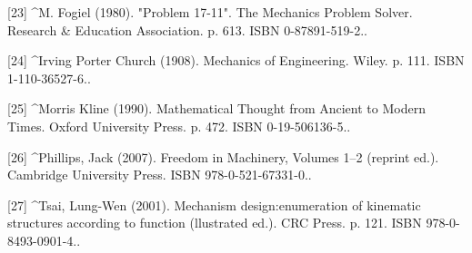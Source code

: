 [23]
^M. Fogiel (1980). "Problem 17-11". The Mechanics Problem Solver. Research & Education Association. p. 613. ISBN 0-87891-519-2..

[24]
^Irving Porter Church (1908). Mechanics of Engineering. Wiley. p. 111. ISBN 1-110-36527-6..

[25]
^Morris Kline (1990). Mathematical Thought from Ancient to Modern Times. Oxford University Press. p. 472. ISBN 0-19-506136-5..

[26]
^Phillips, Jack (2007). Freedom in Machinery, Volumes 1–2 (reprint ed.). Cambridge University Press. ISBN 978-0-521-67331-0..

[27]
^Tsai, Lung-Wen (2001). Mechanism design:enumeration of kinematic structures according to function (llustrated ed.). CRC Press. p. 121. ISBN 978-0-8493-0901-4..